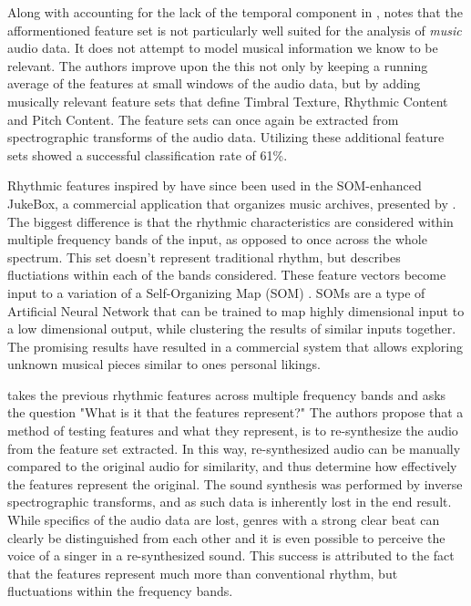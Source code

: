 \documentclass[twoside]{article}
\begin{document}
\begin{multicols}{2}
Along with accounting for the lack of the temporal component in \citet{Wold96}, \citet{Tzanetakis02} notes that the afformentioned feature set is not particularly well suited for the analysis of \textit{music} audio data. It does not attempt to model musical information we know to be relevant. The authors improve upon the this not only by keeping a running average of the features at small windows of the audio data, but by adding musically relevant feature sets that define Timbral Texture, Rhythmic Content and Pitch Content. The feature sets can once again be extracted from spectrographic transforms of the audio data. Utilizing these additional feature sets showed a successful classification rate of 61\%.

Rhythmic features inspired by \citet{Tzanetakis02} have since been used in the SOM-enhanced JukeBox, a commercial application that organizes music archives, presented by \citet{rauber2003som}. The biggest difference is that the rhythmic characteristics are considered within multiple frequency bands of the input, as opposed to once across the whole spectrum. This set doesn't represent traditional rhythm, but describes fluctiations within each of the bands considered. These feature vectors become input to a variation of a Self-Organizing Map (SOM) \citep{kohonen2002make}. SOMs are a type of Artificial Neural Network that can be trained to map highly dimensional input to a low dimensional output, while clustering the results of similar inputs together. The promising results have resulted in a commercial system that allows exploring unknown musical pieces similar to ones personal likings.

\citet{Lidy05} takes the previous rhythmic features across multiple frequency bands and asks the question "What is it that the features represent?" The authors propose that a method of testing features and what they represent, is to re-synthesize the audio from the feature set extracted. In this way, re-synthesized audio can be manually compared to the original audio for similarity, and thus determine how effectively the features represent the original. The sound synthesis was performed by inverse spectrographic transforms, and as such data is inherently lost in the end result. While specifics of the audio data are lost, genres with a strong clear beat can clearly be distinguished from each other and it is even possible to perceive the voice of a singer in a re-synthesized sound. This success is attributed to the fact that the features represent much more than conventional rhythm, but fluctuations within the frequency bands.


\end{multicols}
\end{document}
